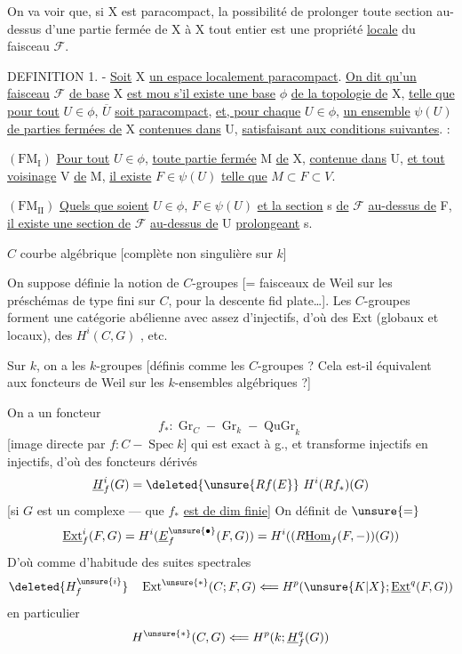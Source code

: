 On va voir que, si X est paracompact, la possibilité de prolonger toute section au-dessus d'une partie fermée de X à X tout entier est une propriété \uline{locale} du faisceau $\mathcal F$.

DEFINITION 1. - \uline{Soit} X \uline{un espace localement paracompact}. \uline{On dit qu'un faisceau} $\mathcal F$ \uline{de base} X \uline{est mou s'il existe une base} $\phi$ \uline{de la topologie de} X, \uline{telle que pour tout} $U\in\phi$, $\overline U$ \uline{soit paracompact}, \uline{et, pour chaque} $U\in\phi$, \uline{un ensemble} $\psi(U)$ \uline{de parties fermées de} X \uline{contenues dans} U, \uline{satisfaisant aux conditions suivantes}. :

$(\mathrm{FM}_{\mathrm I})$ \uline{Pour tout} $U\in\phi$, \uline{toute partie fermée} M \uline{de} X, \uline{contenue dans} U, \uline{et tout voisinage} V \uline{de} M, \uline{il existe} $F\in\psi(U)$ \uline{telle que} $M\subset F\subset V$.

$(\mathrm{FM}_{\mathrm{II}})$ \uline{Quels que soient} $U\in\phi$, $F\in\psi(U)$ \uline{et la section} s \uline{de} $\mathcal F$ \uline{au-dessus de} F, \uline{il existe une section de} $\mathcal F$ \uline{au-dessus de} U \uline{prolongeant} s.


$C$ courbe algébrique [complète non singulière sur $k$]

 On suppose définie la notion de $C$-groupes [= faisceaux de Weil sur les préschémas de  type fini sur $C$, pour la descente fid plate\ldots].  Les $C$-groupes forment une catégorie abélienne avec assez d'injectifs, d'où des Ext (globaux et locaux), des $H^i(C,G)$ , etc.

Sur $k$, on a les $k$-groupes [définis comme les $C$-groupes ? Cela est-il équivalent aux foncteurs de Weil  sur les  $k$-ensembles algébriques ?]

On a un foncteur 
\[
f_*:\operatorname{Gr}_C\mathrel{-}\operatorname{Gr}_k\mathrel{-}\operatorname{QuGr}_k
\]
[image directe par $f:C\mathrel{-}\operatorname{Spec}k$] qui est exact à g.,  et transforme injectifs en injectifs, d'où des foncteurs dérivés
\[
\underline H^i_f(G)=\deleted{\unsure{Rf(E}}\ H^i(Rf_*)(G)
\]
[si $G$ est un complexe    ---  que $f_*$ \uline{est de dim  finie}] On définit de $\unsure{=}$
\[
\underline{\operatorname{Ext}}^i_f(F,G)=H^i(\underline E^{\unsure{\bullet}}_f(F,G))
=H^i((R\underline{\operatorname{Hom}}_f(F,-))(G))
\]
D'où comme d'habitude des suites spectrales
\[
\deleted{H^{\unsure{i}}_f}\quad\operatorname{Ext}^{\unsure{*}}(C;F,G)
\Longleftarrow H^p(\unsure{K|X};\underline{\operatorname{Ext}}^q(F,G))
\]
en particulier
\[
H^{\unsure{*}}(C,G)\Longleftarrow H^p(k;\underline H^q_f(G))
\]

